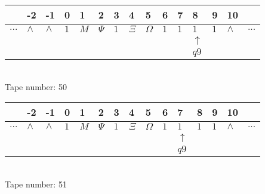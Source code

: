 \documentclass{article}
\begin{document}
\begin{table}[H]
\centering
\begin{tabular}{lllllllllllllll}
 & -2 & -1 & 0 & 1 & 2 & 3 & 4 & 5 & 6 & 7 & 8 & 9 & 10 & \\
\hline
$...$ & \multicolumn{1}{|l|}{$\wedge$} & \multicolumn{1}{|l|}{$\wedge$} & \multicolumn{1}{|l|}{$1$} & \multicolumn{1}{|l|}{$M$} & \multicolumn{1}{|l|}{$\Psi$} & \multicolumn{1}{|l|}{$1$} & \multicolumn{1}{|l|}{$\Xi$} & \multicolumn{1}{|l|}{$\Omega$} & \multicolumn{1}{|l|}{$1$} & \multicolumn{1}{|l|}{$1$} & \multicolumn{1}{|l|}{$1$} & \multicolumn{1}{|l|}{$1$} & \multicolumn{1}{|l|}{$\wedge$} & $...$\\
\hline
&  &  &  &  &  &  &  &  &  &  & $\uparrow$ &  &  &  \\
&  &  &  &  &  &  &  &  &  &  & $ q9 $ &  &  &  \\
\end{tabular}
\\
Tape number: 50
\noindent\makebox[\linewidth]{\hdashrule{\textwidth}{1pt}{1pt}}\end{table}

\begin{table}[H]
\centering
\begin{tabular}{lllllllllllllll}
 & -2 & -1 & 0 & 1 & 2 & 3 & 4 & 5 & 6 & 7 & 8 & 9 & 10 & \\
\hline
$...$ & \multicolumn{1}{|l|}{$\wedge$} & \multicolumn{1}{|l|}{$\wedge$} & \multicolumn{1}{|l|}{$1$} & \multicolumn{1}{|l|}{$M$} & \multicolumn{1}{|l|}{$\Psi$} & \multicolumn{1}{|l|}{$1$} & \multicolumn{1}{|l|}{$\Xi$} & \multicolumn{1}{|l|}{$\Omega$} & \multicolumn{1}{|l|}{$1$} & \multicolumn{1}{|l|}{$1$} & \multicolumn{1}{|l|}{$1$} & \multicolumn{1}{|l|}{$1$} & \multicolumn{1}{|l|}{$\wedge$} & $...$\\
\hline
&  &  &  &  &  &  &  &  &  & $\uparrow$ &  &  &  &  \\
&  &  &  &  &  &  &  &  &  & $ q9 $ &  &  &  &  \\
\end{tabular}
\\
Tape number: 51
\noindent\makebox[\linewidth]{\hdashrule{\textwidth}{1pt}{1pt}}\end{table}
\end{document}
